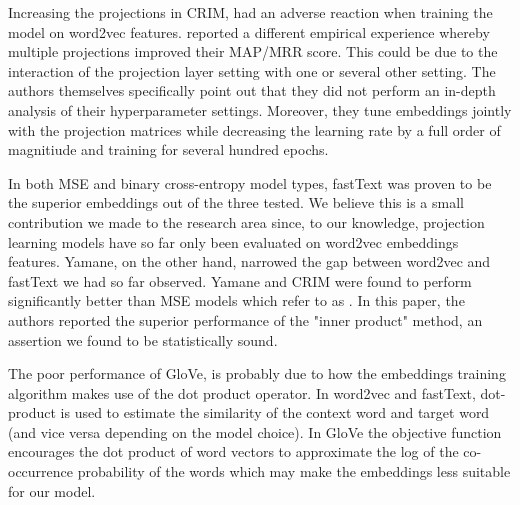 Increasing the projections in CRIM, had an adverse reaction when training the model on word2vec features.  \citet{bernier2018crim} reported a different empirical experience whereby multiple projections improved their \ac{MAP}/\ac{MRR} score.  This could be due to the interaction of the projection layer setting with one or several other setting.  The authors themselves specifically point out that they did not perform an in-depth analysis of their hyperparameter settings.  Moreover, they tune embeddings jointly with the projection matrices while decreasing the learning rate by a full order of magnitiude and training for several hundred epochs.  

In both \ac{MSE} and binary cross-entropy model types, fastText was proven to be the superior embeddings out of the three tested.  We believe this is a small contribution we made to the research area since, to our knowledge, projection learning models have so far only been evaluated on word2vec embeddings features.  Yamane, on the other hand, narrowed the gap between word2vec and fastText we had so far observed.  Yamane and CRIM were found to perform significantly better than \ac{MSE} models which \citet{yamane2016distributional} refer to as . In this paper, the authors reported the superior performance of the "inner product" method, an assertion we found to be statistically sound.

The poor performance of GloVe, is probably due to how the embeddings training algorithm makes use of the dot product operator.  In word2vec and fastText, dot-product is used to estimate the similarity of the context word and target word (and vice versa depending on the model choice).  In GloVe the objective function encourages the dot product of word vectors to approximate the log of the co-occurrence probability of the words which may make the embeddings less suitable for our model.

